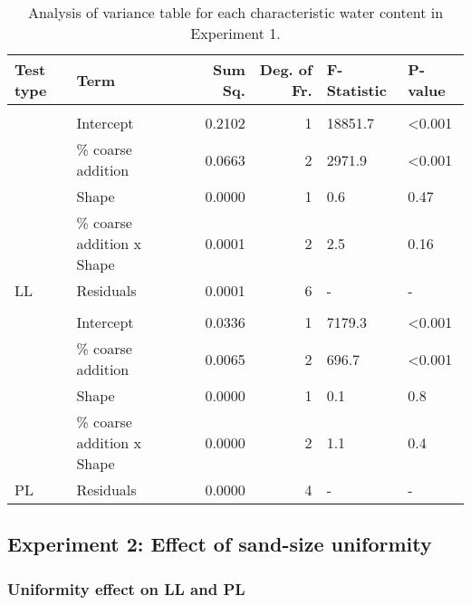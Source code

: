 \documentclass[
  letterpaper,
]{article}
\begin{document}
\begin{table}

\caption{\label{tab:shape-experiment-anova-table}Analysis of variance table for each characteristic water content in Experiment 1.}
\centering
\begin{tabular}[t]{llrrll}
\toprule
\textbf{Test type} & \textbf{Term} & \textbf{Sum Sq.} & \textbf{Deg. of Fr.} & \textbf{F-Statistic} & \textbf{P-value}\\
\midrule
\addlinespace[0.3em]
\multicolumn{6}{l}{\textbf{}}\\
\hline
 & Intercept & 0.2102 & 1 & 18851.7 & <0.001\\
\cmidrule{2-6}
 & \% coarse addition & 0.0663 & 2 & 2971.9 & <0.001\\
\cmidrule{2-6}
 & Shape & 0.0000 & 1 & 0.6 & 0.47\\
\cmidrule{2-6}
 & \% coarse addition x Shape & 0.0001 & 2 & 2.5 & 0.16\\
\cmidrule{2-6}
\multirow{-5}{*}{\raggedright\arraybackslash \hspace{1em}LL} & Residuals & 0.0001 & 6 & - & -\\
\cmidrule{1-6}
\addlinespace[0.3em]
\multicolumn{6}{l}{\textbf{}}\\
\hline
 & Intercept & 0.0336 & 1 & 7179.3 & <0.001\\
\cmidrule{2-6}
 & \% coarse addition & 0.0065 & 2 & 696.7 & <0.001\\
\cmidrule{2-6}
 & Shape & 0.0000 & 1 & 0.1 & 0.8\\
\cmidrule{2-6}
 & \% coarse addition x Shape & 0.0000 & 2 & 1.1 & 0.4\\
\cmidrule{2-6}
\multirow{-5}{*}{\raggedright\arraybackslash \hspace{1em}PL} & Residuals & 0.0000 & 4 & - & -\\
\bottomrule
\end{tabular}
\end{table}

\hypertarget{experiment-2-effect-of-sand-size-uniformity}{%
\subsection{Experiment 2: Effect of sand-size uniformity}\label{experiment-2-effect-of-sand-size-uniformity}}

\hypertarget{uniformity-effect-on-ll-and-pl}{%
\subsubsection{Uniformity effect on LL and PL}\label{uniformity-effect-on-ll-and-pl}}
\end{document}
